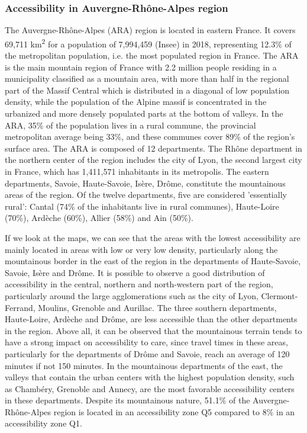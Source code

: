 \subsubsection{Accessibility in Auvergne-Rhône-Alpes region}

The Auvergne-Rhône-Alpes (ARA) region is located in eastern France. It covers
69,711 km\textsuperscript{2} for a population of 7,994,459 (Insee) in 2018,
representing 12.3\% of the metropolitan population, i.e. the most populated
region in France. The ARA is the main mountain region of France with 2.2 million
people residing in a municipality classified as a mountain area, with more than
half in the regional part of the Massif Central which is distributed in a
diagonal of low population density, while the population of the Alpine massif is
concentrated in the urbanized and more densely populated parts at the bottom of
valleys. In the ARA, 35\% of the population lives in a rural commune, the
provincial metropolitan average being 33\%, and these communes cover 89\% of the
region's surface area. The ARA is composed of 12 departments. The Rhône
department in the northern center of the region includes the city of Lyon, the
second largest city in France, which has 1,411,571 inhabitants in its
metropolis. The eastern departments, Savoie, Haute-Savoie, Isère, Drôme,
constitute the mountainous areas of the region. Of the twelve departments, five
are considered 'essentially rural': Cantal (74\% of the inhabitants live in
rural communes), Haute-Loire (70\%), Ardèche (60\%), Allier (58\%) and Ain
(50\%).

If we look at the maps, we can see that the areas with the lowest accessibility
are mainly located in areas with low or very low density, particularly along the
mountainous border in the east of the region in the departments of Haute-Savoie,
Savoie, Isère and Drôme. It is possible to observe a good distribution of
accessibility in the central, northern and north-western part of the region,
particularly around the large agglomerations such as the city of Lyon,
Clermont-Ferrand, Moulins, Grenoble and Aurillac. The three southern
departments, Haute-Loire, Ardèche and Drôme, are less accessible than the other
departments in the region. Above all, it can be observed that the mountainous
terrain tends to have a strong impact on accessibility to care, since travel
times in these areas, particularly for the departments of Drôme and Savoie,
reach an average of 120 minutes if not 150 minutes. In the mountainous
departments of the east, the valleys that contain the urban centers with the
highest population density, such as Chambéry, Grenoble and Annecy, are the most
favorable accessibility centers in these departments. Despite its mountainous
nature, 51.1\% of the Auvergne-Rhône-Alpes region is located in an accessibility
zone Q5 compared to 8\% in an accessibility zone Q1.

